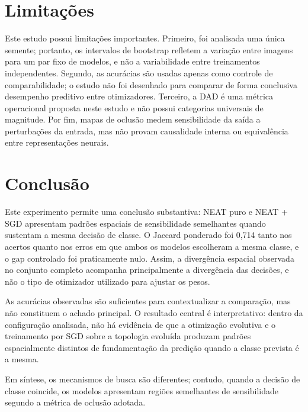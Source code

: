 \section{Limita\c{c}\~oes}

Este estudo possui limita\c{c}\~oes importantes. Primeiro, foi analisada uma \'unica
semente; portanto, os intervalos de bootstrap refletem a varia\c{c}\~ao entre
imagens para um par fixo de modelos, e n\~ao a variabilidade entre treinamentos
independentes. Segundo, as acur\'acias s\~ao usadas apenas como controle de
comparabilidade; o estudo n\~ao foi desenhado para comparar de forma conclusiva
desempenho preditivo entre otimizadores. Terceiro, a DAD \'{e} uma m\'etrica
operacional proposta neste estudo e n\~ao possui categorias universais de
magnitude. Por fim, mapas de oclus\~ao medem sensibilidade da sa\'ida a
perturba\c{c}\~oes da entrada, mas n\~ao provam causalidade interna ou equival\^encia
entre representa\c{c}\~oes neurais.

\section{Conclus\~ao}

Este experimento permite uma conclus\~ao substantiva: NEAT puro e NEAT + SGD
apresentam padr\~oes espaciais de sensibilidade semelhantes quando sustentam a
mesma decis\~ao de classe. O Jaccard ponderado foi 0,714 tanto nos acertos quanto
nos erros em que ambos os modelos escolheram a mesma classe, e o gap controlado
foi praticamente nulo. Assim, a diverg\^encia espacial observada no conjunto
completo acompanha principalmente a diverg\^encia das decis\~oes, e n\~ao o tipo de
otimizador utilizado para ajustar os pesos.

As acur\'acias observadas s\~ao suficientes para contextualizar a compara\c{c}\~ao,
mas n\~ao constituem o achado principal. O resultado central \'{e}
interpretativo: dentro da configura\c{c}\~ao analisada, n\~ao h\'a evid\^encia de que a
otimiza\c{c}\~ao evolutiva e o treinamento por SGD sobre a topologia evolu\'ida
produzam padr\~oes espacialmente distintos de fundamenta\c{c}\~ao da predi\c{c}\~ao
quando a classe prevista \'{e} a mesma.

Em s\'intese, os mecanismos de busca s\~ao diferentes; contudo, quando a decis\~ao
de classe coincide, os modelos apresentam regi\~oes semelhantes de sensibilidade
segundo a m\'etrica de oclus\~ao adotada.
